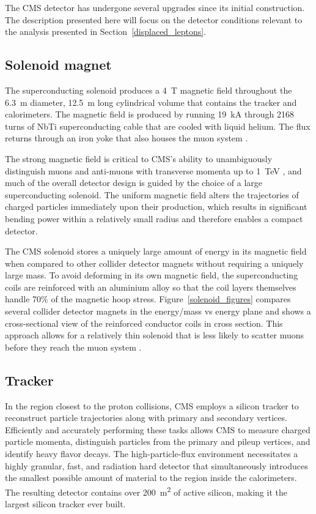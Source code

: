 The CMS detector has undergone several upgrades since its initial construction. The description presented here will focus on the detector conditions relevant to the analysis presented in Section~\ref{displaced_leptons}.

\subsection{Solenoid magnet}
The superconducting solenoid produces a \SI{4}{\tesla} magnetic field throughout the \SI{6.3}{\metre} diameter, \SI{12.5}{\metre} long cylindrical volume that contains the tracker and calorimeters. The magnetic field is produced by running \SI{19}{\kA} through 2168 turns of NbTi superconducting cable that are cooled with liquid helium. The flux returns through an iron yoke that also houses the muon system \cite{cms_experiment}.

The strong magnetic field is critical to CMS's ability to unambiguously distinguish muons and anti-muons with transverse momenta up to \SI{1}{\TeV} \cite{cms_tdr_v1}, and much of the overall detector design is guided by the choice of a large superconducting solenoid. The uniform magnetic field alters the trajectories of charged particles immediately upon their production, which results in significant bending power within a relatively small radius and therefore enables a compact detector.

The CMS solenoid stores a uniquely large amount of energy in its magnetic field when compared to other collider detector magnets without requiring a uniquely large mass. To avoid deforming in its own magnetic field, the superconducting coils are reinforced with an aluminium alloy so that the coil layers themselves handle 70\% of the magnetic hoop stress. Figure~\ref{solenoid_figures} compares several collider detector magnets in the energy/mass vs energy plane and shows a cross-sectional view of the reinforced conductor coils in cross section. This approach allows for a relatively thin solenoid that is less likely to scatter muons before they reach the muon system \cite{cms_experiment}. 



\subsection{Tracker}
\label{tracker}
In the region closest to the proton collisions, CMS employs a silicon tracker to reconstruct particle trajectories along with primary and secondary vertices. Efficiently and accurately performing these tasks allows CMS to measure charged particle momenta, distinguish particles from the primary and pileup vertices, and identify heavy flavor decays. The high-particle-flux environment necessitates a highly granular, fast, and radiation hard detector that simultaneously introduces the smallest possible amount of material to the region inside the calorimeters. The resulting detector contains over \SI{200}{\m\tothe{2}} of active silicon, making it the largest silicon tracker ever built.

